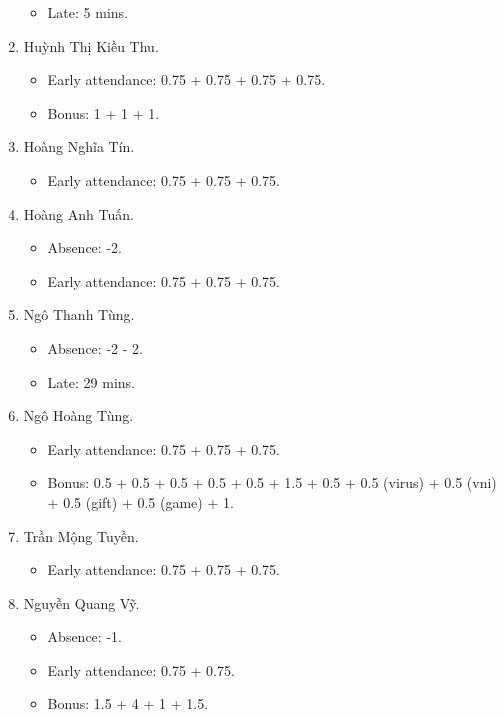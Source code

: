 \documentclass{article}
\begin{document}
\begin{enumerate}
\begin{itemize}
		\item Late: 5 mins.
	\end{itemize}
	\item {\sc Huỳnh Thị Kiều Thu.}
	\begin{itemize}
		\item Early attendance: 0.75 + 0.75 + 0.75 + 0.75.
		\item Bonus: 1 + 1 + 1.
	\end{itemize}
	\item {\sc Hoàng Nghĩa Tín.}
	\begin{itemize}
		\item Early attendance: 0.75 + 0.75 + 0.75.
	\end{itemize}
	\item {\sc Hoàng Anh Tuấn.}
	\begin{itemize}
		\item Absence: -2.
		\item Early attendance: 0.75 + 0.75 + 0.75.
	\end{itemize}
	\item {\sc Ngô Thanh Tùng.}
	\begin{itemize}
		\item Absence: -2 - 2.
		\item Late: 29 mins.
	\end{itemize}
	\item {\sc Ngô Hoàng Tùng.}
	\begin{itemize}
		\item Early attendance: 0.75 + 0.75 + 0.75.
		\item Bonus: 0.5 + 0.5 + 0.5 + 0.5 + 0.5 + 1.5 + 0.5 + 0.5 (virus) + 0.5 (vni) + 0.5 (gift) + 0.5 (game) + 1.
	\end{itemize}
	\item {\sc Trần Mộng Tuyền.}
	\begin{itemize}
		\item Early attendance: 0.75 + 0.75 + 0.75.
	\end{itemize}
	\item {\sc Nguyễn Quang Vỹ.}
	\begin{itemize}
		\item Absence: -1.
		\item Early attendance: 0.75 + 0.75.
		\item Bonus: 1.5 + 4 + 1 + 1.5.
	\end{itemize}
\end{enumerate}

\end{document}
